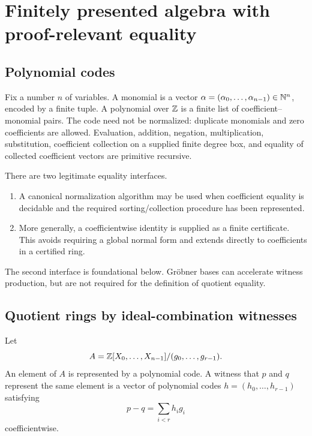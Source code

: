 \section{Finitely presented algebra with proof-relevant equality}

\subsection{Polynomial codes}

Fix a number $n$ of variables.  A monomial is a vector
$\alpha=(\alpha_0,\ldots,\alpha_{n-1})\in\mathbb N^n$, encoded by a finite tuple.  A polynomial over
$\mathbb Z$ is a finite list of coefficient--monomial pairs.  The code need not be normalized: duplicate
monomials and zero coefficients are allowed.  Evaluation, addition, negation, multiplication,
substitution, coefficient collection on a supplied finite degree box, and equality of collected
coefficient vectors are primitive recursive.

There are two legitimate equality interfaces.

\begin{enumerate}[label=\arabic*.]
\item A canonical normalization algorithm may be used when coefficient equality is decidable and the
      required sorting/collection procedure has been represented.
\item More generally, a coefficientwise identity is supplied as a finite certificate.  This avoids
      requiring a global normal form and extends directly to coefficients in a certified ring.
\end{enumerate}

The second interface is foundational below.  Gröbner bases can accelerate witness production, but
are not required for the definition of quotient equality.

\subsection{Quotient rings by ideal-combination witnesses}

Let
\[
 A=\mathbb Z[X_0,\ldots,X_{n-1}]/(g_0,\ldots,g_{r-1}).
\]
An element of $A$ is represented by a polynomial code.  A witness that $p$ and $q$ represent the
same element is a vector of polynomial codes $h=(h_0,\ldots,h_{r-1})$ satisfying
\begin{equation}\label{eq:ideal-witness}
        p-q=\sum_{i<r} h_i g_i
\end{equation}
coefficientwise.

